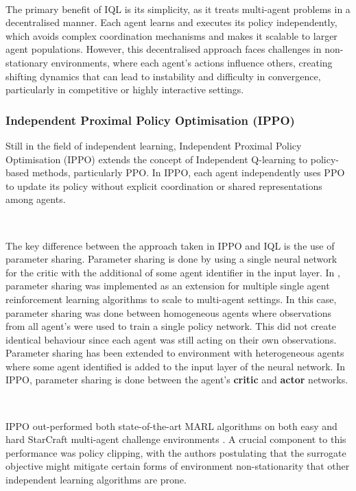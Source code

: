 \documentclass{article}
\begin{document}
\

The primary benefit of IQL is its simplicity, as it treats multi-agent problems in a decentralised manner. Each agent learns and executes its policy independently, which avoids complex coordination mechanisms and makes it scalable to larger agent populations. However, this decentralised approach faces challenges in non-stationary environments, where each agent's actions influence others, creating shifting dynamics that can lead to instability and difficulty in convergence, particularly in competitive or highly interactive settings.

\subsubsection{Independent Proximal Policy Optimisation (IPPO)}

Still in the field of independent learning, Independent Proximal Policy Optimisation (IPPO) \citet{witt2020independent} extends the concept of Independent Q-learning to policy-based methods, particularly PPO. In IPPO, each agent independently uses PPO to update its policy without explicit coordination or shared representations among agents. 

\


The key difference between the approach taken in IPPO and IQL is the use of parameter sharing. Parameter sharing is done by using a single neural network for the critic with the additional of some agent identifier in the input layer. In \citet{gupta2017cooperative}, parameter sharing was implemented as an extension for multiple single agent reinforcement learning algorithms to scale to multi-agent settings. In this case, parameter sharing was done between homogeneous agents where observations from all agent's were used to train a single policy network. This did not create identical behaviour since each agent was still acting on their own observations. Parameter sharing has been extended to environment with heterogeneous agents where some agent identified is added to the input layer of the neural network. In IPPO, parameter sharing is done between the agent's \textbf{critic} and \textbf{actor} networks.

\

IPPO out-performed both state-of-the-art MARL algorithms on both easy and hard StarCraft multi-agent challenge environments \citep{witt2020independent}. A crucial component to this performance was policy clipping, with the authors postulating that the surrogate objective might mitigate certain forms of environment non-stationarity that other independent learning algorithms are prone.
\end{document}
